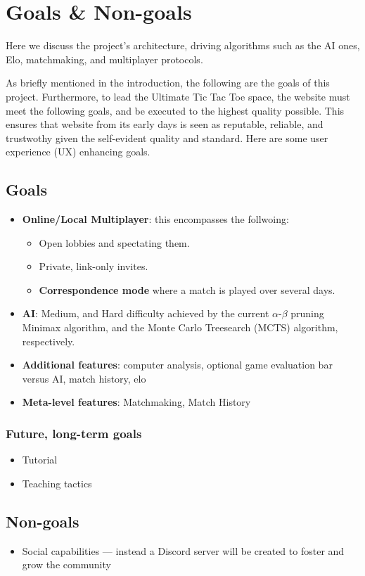 \section{Goals \& Non-goals}

Here we discuss the project's architecture, driving algorithms
such as the AI ones, Elo, matchmaking, and multiplayer protocols.


As briefly mentioned in the introduction, the following are the goals of this project.
Furthermore, to lead the Ultimate Tic Tac Toe space, the website must meet the following goals, and be executed
to the highest quality possible. This ensures that website from its early days is seen as reputable, reliable, and trustwothy 
given the self-evident quality and standard. Here are some user experience (UX) enhancing goals. 

\label{sec:goals}

\subsection{Goals}
\begin{itemize}
   \item \textbf{Online/Local Multiplayer}: this encompasses the follwoing: 
    \begin{itemize}
        \item Open lobbies and spectating them.
        \item Private, link-only invites.
        \item \textbf{Correspondence mode} where a match is played over several days.
    \end{itemize}
   
   \item \textbf{AI}: Medium, and Hard difficulty achieved by the current
    $\alpha$-$\beta$ pruning Minimax algorithm, 
    and the Monte Carlo Treesearch (MCTS) algorithm, respectively.
    \item \textbf{Additional features}: computer analysis, optional game evaluation bar versus AI, match history, elo
    \item \textbf{Meta-level features}: Matchmaking, Match History
\end{itemize}

\subsubsection {Future, long-term goals}

\begin{itemize}
    \item Tutorial
    \item Teaching tactics
\end{itemize}

\subsection {Non-goals}
\begin{itemize}
    \item Social capabilities — instead a Discord server will be created to foster and grow the community
\end{itemize}